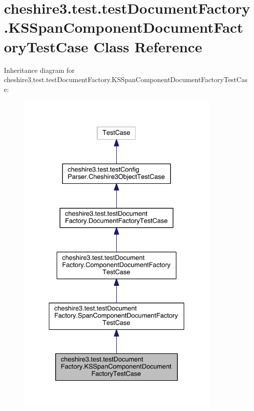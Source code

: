 \hypertarget{classcheshire3_1_1test_1_1test_document_factory_1_1_k_s_span_component_document_factory_test_case}{\section{cheshire3.\-test.\-test\-Document\-Factory.\-K\-S\-Span\-Component\-Document\-Factory\-Test\-Case Class Reference}
\label{classcheshire3_1_1test_1_1test_document_factory_1_1_k_s_span_component_document_factory_test_case}
}


Inheritance diagram for cheshire3.\-test.\-test\-Document\-Factory.\-K\-S\-Span\-Component\-Document\-Factory\-Test\-Case\-:
\nopagebreak
\begin{figure}[H]
\begin{center}
\leavevmode
\includegraphics[width=286pt]{classcheshire3_1_1test_1_1test_document_factory_1_1_k_s_span_component_document_factory_test_case__inherit__graph}
\end{center}
\end{figure}


